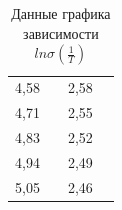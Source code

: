 \documentclass[a4paper,12pt]{report}
\begin{document}
\begin{table}[h!]
\begin{tabular}{|c|c|c|c|}
4,58      &                        & 2,58 &                        \\ \cline{1-1} \cline{3-3}
4,71      &                        & 2,55 &                        \\ \cline{1-1} \cline{3-3}
4,83      &                        & 2,52 &                        \\ \cline{1-1} \cline{3-3}
4,94      &                        & 2,49 &                        \\ \cline{1-1} \cline{3-3}
5,05      &                        & 2,46 &                        \\ \hline
\end{tabular}
\caption{Данные графика зависимости $ln\sigma(\frac{1}{T})$}
\label{sigma}
\end{table}
\end{document}
